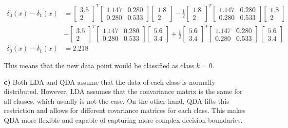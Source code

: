 \documentclass{article}
\begin{document}
\begin{equation}
  \begin{aligned}
    \delta_0(x) - \delta_1(x) &= \begin{bmatrix} 3.5 \\ 2 \end{bmatrix}^T \begin{bmatrix}
      1.147 & 0.280 \\
      0.280 & 0.533
    \end{bmatrix}\begin{bmatrix} 1.8 \\ 2 \end{bmatrix} - \frac{1}{2}\begin{bmatrix} 1.8 \\ 2 \end{bmatrix}^T
    \begin{bmatrix}
      1.147 & 0.280 \\
      0.280 & 0.533
    \end{bmatrix}\begin{bmatrix} 1.8 \\ 2 \end{bmatrix} \\
    &- \begin{bmatrix} 3.5 \\ 2 \end{bmatrix}^T \begin{bmatrix}
      1.147 & 0.280 \\
      0.280 & 0.533
    \end{bmatrix}\begin{bmatrix} 5.6 \\ 3.4 \end{bmatrix} + \frac{1}{2}\begin{bmatrix} 5.6 \\ 3.4 \end{bmatrix}^T \begin{bmatrix}
      1.147 & 0.280 \\
      0.280 & 0.533
    \end{bmatrix}\ \begin{bmatrix} 5.6 \\ 3.4 \end{bmatrix} \\
  \delta_0(x) - \delta_1(x) &= 2.218
  \end{aligned} 
\end{equation}

This means that the new data point would be classified as class $k = 0$.

\textbf{c)} Both LDA and QDA assume that the data of each class is normally distributed. However, LDA assumes that the convariance matrix is the same for all classes, which usually is not the case. On the other hand, QDA lifts this restriction and allows for different covariance matrices for each class. This makes QDA more flexible and capable of capturing more complex decision boundaries.

\clearpage

% 
%  

\end{document}
